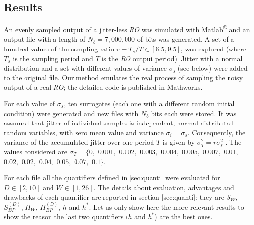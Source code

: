 \subsection{Results}
\label{sec:resu}

An evenly sampled output of a jitter-less \emph{RO} was simulated with Matlab\textsuperscript{\copyright} and an output file with a length of $N_b=7,000,000$ of bits was generated. A set of a hundred values of the sampling ratio $r= T_s/T\in[6.5,9.5]$, was explored (where $T_s$ is the sampling period and $T$ is the \emph{RO}  output period). Jitter with a normal distribution and a set with different values of variance $\sigma_s$ (see below) were added to the original file. Our method emulates the real process of sampling the noisy output of a real \emph{RO}; the detailed code is published in Mathworks\cite{MathworksMaxi}.

For each value of $\sigma_s$, ten surrogates (each one with a different random initial condition) were generated and new files with $N_b$ bits each were stored. It was assumed that jitter of individual samples is independent, normal distributed random variables, with zero mean value and variance $\sigma_i=\sigma_s$. Consequently, the variance of the accumulated jitter over one period $T$ is given by $\sigma^2_T=r \sigma^2_s$ \cite{Valtchanov2008}. The values considered  are $\sigma_T=\{0,$ $0.001,$ $0.002,$ $0.003,$ $0.004,$ $0.005,$ $0.007,$ $0.01,$ $0.02,$ $0.02,$ $0.04,$ $0.05,$ $0.07,$ $0.1\}$.

For each file all the quantifiers defined in \ref{sec:quanti} were evaluated for $D\in[2,10]$ and $W\in[1,26]$. The details about evaluation, advantages and drawbacks of each quantifier are reported in section \ref{sec:quanti}: they are $S_W$, $S^{(D)}_{BP}$, $H_{W}$, $H^{(D)}_{BP}$, $h$ and $h^*$.  Let us only show here the  more relevant results  to show the reason the last two quantifiers ($h$ and $h^*$) are the best ones.

